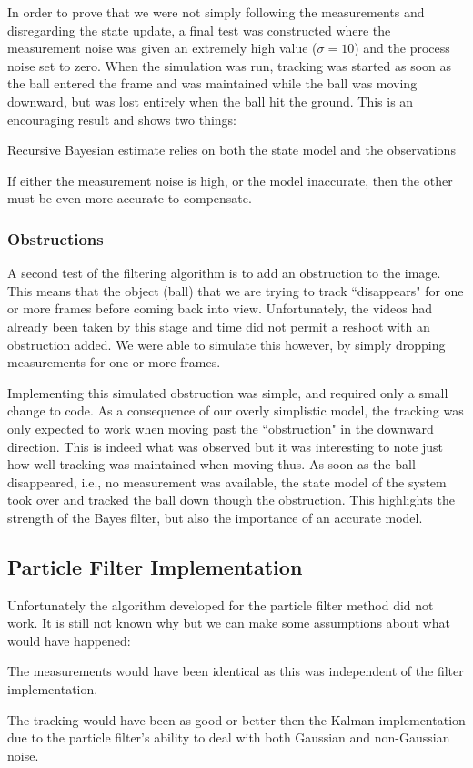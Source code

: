 In order to prove that we were not simply following the measurements and
disregarding the state update, a final test was constructed where the measurement
noise was given an extremely high value ($\sigma = 10$) and the process noise set
to zero. When the simulation was run, tracking was started as
soon as the ball entered the frame and was maintained while the ball was
moving downward, but was lost entirely
when the ball hit the ground. This is an encouraging result and shows two things:
\begin{compactitem}
\item Recursive Bayesian estimate relies on both the state model and the observations
\item If either the measurement noise is high, or the model inaccurate, then the
other must be even more accurate to compensate.
\end{compactitem}

\subsubsection{Obstructions}
A second test of the filtering algorithm is to add an obstruction to the image.
This means that the object (ball) that we are trying to track ``disappears"
for one or more frames before coming back into view. Unfortunately, the videos
had already been taken by this stage and time did not permit a reshoot with
an obstruction added. We were able to simulate this however, by simply dropping
measurements for one or more frames.

Implementing this simulated obstruction was simple, and required only a small
change to code. As a consequence of our overly simplistic model, the
tracking was only expected to work when moving past the ``obstruction" in the
downward direction. This is indeed what was observed but it was interesting to
note just how well tracking was maintained when moving thus.
As soon as the ball disappeared, i.e., no measurement was
available, the state model of the system took over and tracked the ball down
though the obstruction. This highlights the strength of the Bayes filter, but also
the importance of an accurate model.

\subsection{Particle Filter Implementation}
Unfortunately the algorithm developed for the particle filter method did not work.
It is still not known why but we can make some assumptions about what would
have happened:
\begin{compactitem}
\item The measurements would have been identical as this was independent of the
filter implementation.
\item The tracking would have been as good or better then the Kalman implementation
due to the particle filter's ability to deal with both Gaussian and non-Gaussian
noise.
\end{compactitem}


